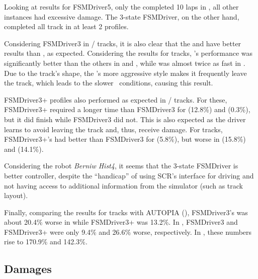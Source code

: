 Looking at results for FSMDriver5, only the  completed 10 laps in , all other instances had excessive damage. The 3-state FSMDriver, on the other hand, completed all track in at least 2 profiles.

Considering FSMDriver3 in / tracks, it is also clear that the  and  have better results than , as expected. Considering the results for  tracks, 's performance was significantly better than the others in  and , while  was almost twice as fast in . Due to the track's shape, the 's more aggressive style makes it frequently leave the track, which leads to the slower \recovery~conditions, causing this result.

FSMDriver3+ profiles also performed as expected in / tracks. For these, FSMDriver3+ required a longer time than FSMDriver3 for  (12.8\%) and  (0.3\%), but it did finish  while FSMDriver3 did not. This is also expected as the driver learns to avoid leaving the track and, thus, receive damage. For  tracks, FSMDriver3+'s  had better than FSMDriver3 for  (5.8\%), but worse in  (15.8\%) and  (14.1\%).

Considering the robot \emph{Berniw Hist4}, it seems that the 3-state FSMDriver is better controller, despite the ``handicap'' of using SCR's interface for driving and not having access to additional information from the simulator (such as track layout).

Finally, comparing the results for  tracks with AUTOPIA (\cite{AUTOPIA}), FSMDriver3's  was about 20.4\% worse in  while FSMDriver3+ was 13.2\%. In , FSMDriver3 and FSMDriver3+ were only 9.4\% and 26.6\% worse, respectively. In , these numbers rise to 170.9\% and 142.3\%.





\subsection{Damages}

